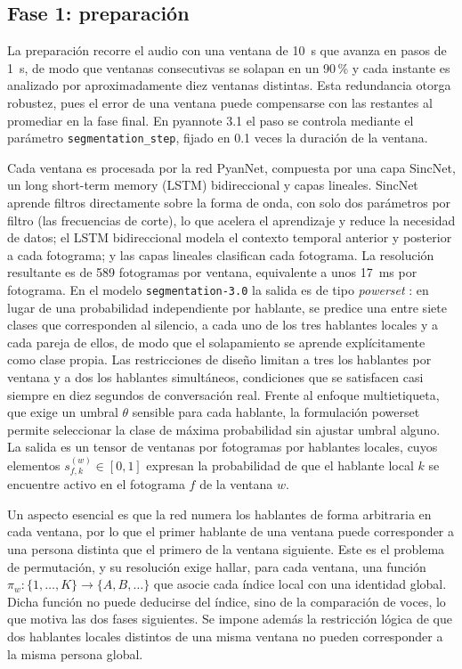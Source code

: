 \documentclass[11pt,a4paper]{article}
\begin{document}
\subsection{Fase 1: preparación}

La preparación recorre el audio con una ventana de 10~s que avanza en pasos de 1~s, de modo que ventanas consecutivas se solapan en un 90\,\% y cada instante es analizado por aproximadamente diez ventanas distintas. Esta redundancia otorga robustez, pues el error de una ventana puede compensarse con las restantes al promediar en la fase final. En pyannote 3.1 el paso se controla mediante el parámetro \texttt{segmentation\_step}, fijado en 0.1 veces la duración de la ventana.

Cada ventana es procesada por la red PyanNet, compuesta por una capa SincNet, un long short-term memory (LSTM) bidireccional y capas lineales. SincNet \cite{ravanelli2018} aprende filtros directamente sobre la forma de onda, con solo dos parámetros por filtro (las frecuencias de corte), lo que acelera el aprendizaje y reduce la necesidad de datos; el LSTM bidireccional modela el contexto temporal anterior y posterior a cada fotograma; y las capas lineales clasifican cada fotograma. La resolución resultante es de 589 fotogramas por ventana, equivalente a unos 17~ms por fotograma. En el modelo \texttt{segmentation-3.0} la salida es de tipo \emph{powerset} \cite{plaquet2023}: en lugar de una probabilidad independiente por hablante, se predice una entre siete clases que corresponden al silencio, a cada uno de los tres hablantes locales y a cada pareja de ellos, de modo que el solapamiento se aprende explícitamente como clase propia. Las restricciones de diseño limitan a tres los hablantes por ventana y a dos los hablantes simultáneos, condiciones que se satisfacen casi siempre en diez segundos de conversación real. Frente al enfoque multietiqueta, que exige un umbral $\theta$ sensible para cada hablante, la formulación powerset permite seleccionar la clase de máxima probabilidad sin ajustar umbral alguno. La salida es un tensor de ventanas por fotogramas por hablantes locales, cuyos elementos $s^{(w)}_{f,k}\in[0,1]$ expresan la probabilidad de que el hablante local $k$ se encuentre activo en el fotograma $f$ de la ventana $w$.

Un aspecto esencial es que la red numera los hablantes de forma arbitraria en cada ventana, por lo que el primer hablante de una ventana puede corresponder a una persona distinta que el primero de la ventana siguiente. Este es el problema de permutación, y su resolución exige hallar, para cada ventana, una función $\pi_w:\{1,\dots,K\}\to\{A,B,\dots\}$ que asocie cada índice local con una identidad global. Dicha función no puede deducirse del índice, sino de la comparación de voces, lo que motiva las dos fases siguientes. Se impone además la restricción lógica de que dos hablantes locales distintos de una misma ventana no pueden corresponder a la misma persona global.
\end{document}
